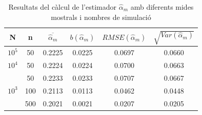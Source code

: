 \documentclass[12pt, catalan]{article}
\numberwithin{table}{section}
\numberwithin{figure}{section}
\numberwithin{equation}{section}
\begin{document}
\begin{table}[h]
\centering
\caption{Resultats del càlcul de l'estimador $\hat{\alpha}_m$ amb diferents mides mostrals i nombres de simulació}\vspace{0.3cm}
\begin{tabular}{|c|c|c|c|c|c|}
\hline
N                    & n   & $\overline{\hat{\alpha}_m}$    &$b(\hat{\alpha}_m)$& $RMSE(\hat{\alpha}_m)$ & $\sqrt{Var(\hat{\alpha}_m)}$ \\ \hline
$10^5$                  & 50  &  0.2225 &0.0225& 0.0697 & 0.0660 \\ \hline
$10^4$                   & 50  &  0.2224 &0.0224& 0.0700 & 0.0663 \\ \hline
\multirow{3}{*}{$10^3$ } & 50  &  0.2233 &0.0233& 0.0707 & 0.0667 \\ \cline{2-6} 
                     & 100 &  0.2113 &0.0113& 0.0462 & 0.0448 \\ \cline{2-6} 
                     & 500 &  0.2021 &0.0021& 0.0207 & 0.0205 \\ \hline
\end{tabular}
\label{globalalpha}
\end{table}
\end{document}
